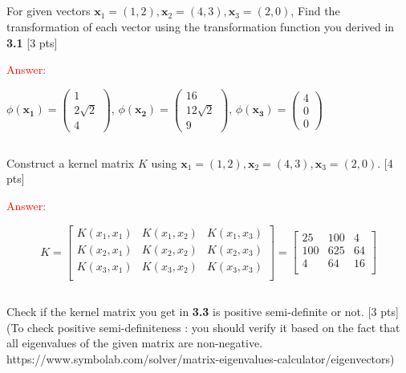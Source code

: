 \documentclass{homework}
\begin{document}
    \subsection{}
    For given vectors $\mathbf{x}_1 = (1,2),\mathbf{x}_2 = (4,3),\mathbf{x}_3 = (2,0)$,
    Find the transformation of each vector using the transformation function you derived in \textbf{3.1} [3 pts]

    \textcolor{red}{Answer:}
    
    $\phi(\mathbf{x_1}) = \left(\begin{matrix} 1 \\ 2\sqrt{2} \\ 4 \end{matrix}\right)$, \quad $\phi(\mathbf{x_2}) = \left(\begin{matrix} 16 \\ 12\sqrt{2} \\ 9 \end{matrix}\right)$, \quad $\phi(\mathbf{x_3}) = \left(\begin{matrix} 4 \\ 0 \\ 0 \end{matrix}\right)$

    \subsection{}
    Construct a kernel matrix $K$ using $\mathbf{x}_1 = (1,2),\mathbf{x}_2 = (4,3),\mathbf{x}_3 = (2,0)$. [4 pts]
    
    \textcolor{red}{Answer:}
    
    \begin{equation*}
    K = \left[\begin{matrix}
    K(x_1,x_1) & K(x_1,x_2) & K(x_1,x_3) \\
    K(x_2,x_1) & K(x_2,x_2) & K(x_2,x_3) \\
    K(x_3,x_1) & K(x_3,x_2) & K(x_3,x_3) \\
    \end{matrix}\right]
    = \left[\begin{matrix}
    25 & 100 & 4 \\
    100 & 625 & 64 \\
    4 & 64 & 16 \\
    \end{matrix}\right]
    \end{equation*}
    
    \subsection{}
    Check if the kernel matrix you get in \textbf{3.3} is positive semi-definite or not. [3 pts] (To check positive semi-definiteness : you should verify it based on the fact that all eigenvalues of the given matrix are non-negative. https://www.symbolab.com/solver/matrix-eigenvalues-calculator/eigenvectors)
    
\end{document}
